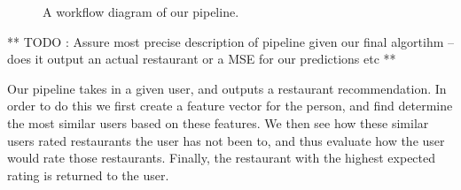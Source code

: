 \documentclass[10pt,twocolumn,letterpaper]{article}
\begin{document}
\begin{figure}[t]
\begin{center}
\end{center}
   \caption{A workflow diagram of our pipeline.}
\label{fig:long}
\label{fig:onecol}
\end{figure}

** TODO : Assure most precise description of pipeline given our final algortihm -- does it output an actual restaurant or a MSE for our predictions etc **

Our pipeline takes in a given user, and outputs a restaurant recommendation. In order to do this we first create a feature vector for the person, and find determine the most similar users based on these features. We then see how these similar users rated restaurants the user has not been to, and thus evaluate how the user would rate those restaurants. Finally, the restaurant with the highest expected rating is returned to the user.
\end{document}
